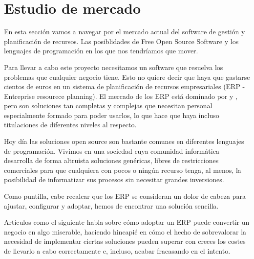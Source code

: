 \section{Estudio de mercado}
En esta sección vamos a navegar por el mercado actual del software de gestión y planificación de recursos. Las posiblidades de Free Open Source Software y los lenguajes de programación en los que nos tendríamos que mover.
\par Para llevar a cabo este proyecto necesitamos un software que resuelva los problemas que cualquier negocio tiene. Esto no quiere decir que haya que gastarse cientos de euros en un sistema de planificación de recursos empresariales (ERP - Entreprise resourece planning). El mercado de los ERP está dominado por \cite{oracleERP} y \cite{sapERP}, pero son soluciones tan completas y complejas que necesitan personal especialmente formado para poder usarlos, lo que hace que haya incluso titulaciones de diferentes niveles al respecto.
\par Hoy día las soluciones open source son bastante comunes en diferentes lenguajes de programación. Vivimos en una sociedad cuya comunidad informática desarrolla de forma altruista soluciones genéricas, libres de restricciones comerciales para que cualquiera con pocos o ningún recurso tenga, al menos, la posibilidad de informatizar sus procesos sin necesitar grandes inversiones.
\par Como puntilla, cabe recalcar que los ERP se consideran un dolor de cabeza para ajustar, configurar y adoptar, hemos de encontrar una solución sencilla.
\par Artículos como el siguiente \citep{makingBusinessesMiserable} habla sobre cómo adoptar un ERP puede convertir un negocio en algo miserable, haciendo hincapié en cómo el hecho de sobrevalorar la necesidad de implementar ciertas soluciones pueden superar con creces los costes de llevarlo a cabo correctamente e, incluso, acabar fracasando en el intento.
\clearpage
